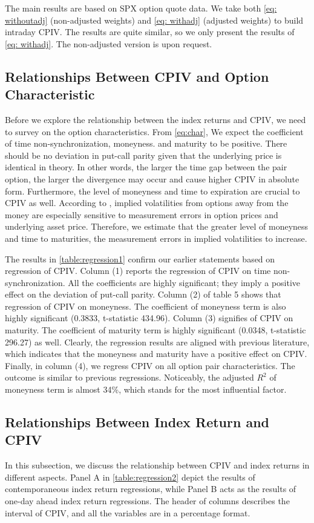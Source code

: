 
The main results are based on SPX option quote data. We take both \autoref{eq: withoutadj} (non-adjusted weights) and \autoref{eq: withadj} (adjusted weights) to build intraday CPIV. The results are quite similar, so we only present the results of \autoref{eq: withadj}. The non-adjusted version is upon request.

\subsection{Relationships Between CPIV and Option Characteristic}
Before we explore the relationship between the index returns and CPIV, we need to survey on the option characteristics. From \autoref{eq:char}, We expect the coefficient of time non-synchronization, moneyness. and maturity to be positive. There should be no deviation in put-call parity given that the underlying price is identical in theory. In other words, the larger the time gap between the pair option, the larger the divergence may occur and cause higher CPIV in absolute form. Furthermore, the level of moneyness and time to expiration are crucial to CPIV as well. According to \textcite{hentschel2003errors}, implied volatilities from options away from the money are especially sensitive to measurement errors in option prices and underlying asset price. Therefore, we estimate that the greater level of moneyness and time to maturities, the measurement errors in implied volatilities to increase. 

The results in \autoref{table:regression1} confirm our earlier statements based on regression of CPIV. Column (1) reports the regression of CPIV on time non-synchronization. All the coefficients are highly significant; they imply a positive effect on the deviation of put-call parity. Column (2) of table 5 shows that regression of CPIV on moneyness. The coefficient of moneyness term is also highly significant (0.3833, t-statistic 434.96). Column (3) signifies of CPIV on maturity. The coefficient of maturity term is highly significant (0.0348, t-statistic 296.27) as well. Clearly, the regression results are aligned with previous literature, which indicates that the moneyness and maturity have a positive effect on CPIV. Finally, in column (4), we regress CPIV on all option pair characteristics. The outcome is similar to previous regressions. Noticeably, the adjusted $R^{2}$ of moneyness term is almost 34\%, which stands for the most influential factor.  

\subsection{Relationships Between Index Return and CPIV}
In this subsection, we discuss the relationship between CPIV and index returns in different aspects. Panel A in \autoref{table:regression2} depict the results of contemporaneous index return regressions, while Panel B acts as the results of one-day ahead index return regressions. The header of columns describes the interval of CPIV, and all the variables are in a percentage format. 

